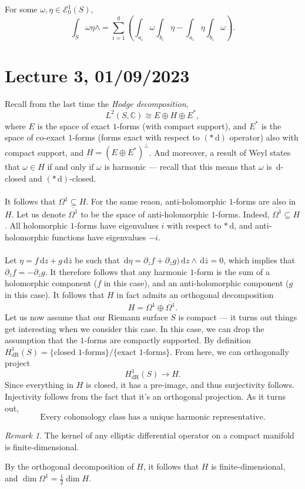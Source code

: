 \documentclass[a4paper]{report}
\theoremstyle{definition}
\theoremstyle{remark}
\newtheorem{remark}{Remark}
\theoremstyle{proposition}
\theoremstyle{conjecture}
\theoremstyle{lemma}
\theoremstyle{corollary}
\theoremstyle{exercise}
\theoremstyle{example}
\newcommand{\C}{\mathbb{C}}
\newcommand{\mcal}{\mathcal}
\newcommand{\diff}{\,\mathrm{d}}
\newcommand{\on}{\operatorname}
\begin{document}
\begin{theorem}
    For some $\omega, \eta \in \mcal{E}^1_0(S)$,
    $$\int_S \omega \eta \wedge = \sum_{i=1}^g \left( \int_{a_i}\omega \int_{b_i}\eta - \int_{a_i}\eta \int_{b_i}\omega\right).$$
\end{theorem}

\section{Lecture 3, 01/09/2023}

Recall from the last time the \emph{Hodge decomposition},
$$L^2(S,\C) \cong E \oplus H \oplus E^\ast,$$
where $E$ is the space of exact $1$-forms (with compact support), and $E^\ast$ is the space of co-exact 
$1$-forms (forms exact with respect to $(\ast \diff)$ operator) also with compact support, and 
$H = (E\oplus E^\ast)^\perp$.
And moreover, a result of Weyl states that $\omega \in H$ if and only if 
$\omega$ is harmonic --- recall that this means that $\omega$ is 
$\diff$-closed and $(\ast \diff)$-closed. \\\\It follows that $\Omega^1 \subseteq H$. 
For the same reaon, anti-holomorphic $1$-forms are also in $H$. Let us 
denote $\overline{\Omega^1}$ to be the space of anti-holomorphic $1$-forms.
Indeed, $\overline{\Omega^1}\subseteq H$. All holomorphic $1$-forms have eigenvalues $i$ with respect to $\ast \diff$, and anti-holomorphic functions have 
eigenvalues $-i$.\\\\
Let $\eta = f \diff z + g \diff \bar{z}$ be such that $\diff \eta = \partial_{\overline{z}}f + \partial_z g)\diff z \wedge \diff \bar{z}= 0$,
which implies that $\partial_{\bar{z}}f = -\partial_zg$. It therefore 
follows that any harmonic $1$-form is the sum of a holomorphic 
component ($f$ in this case), and an anti-holomorphic component ($g$ in this case). It follows that $H$ in fact admits an orthogonal decomposition 
$$H = \Omega^1\oplus \overline{\Omega^1}.$$
Let us now assume that our Riemann surface $S$ is compact --- it turns out 
things get interesting when we consider this case. In this case,
we can drop the assumption that the $1$-forms are compactly supported.
By definition $H^1_{\on{dR}}(S) = \lbrace \text{closed $1$-forms}\rbrace/\lbrace \text{exact $1$-forms}\rbrace$. From here, we can orthogonally 
project $$H^1_{\on{dR}}(S) \longrightarrow H.$$ 
Since everything in $H$ is closed, it has a pre-image, and thus surjectivity 
follows. Injectivity follows from the fact that it's an orthogonal projection.
As it turns out, $$\text{Every cohomology class has a unique harmonic representative.}$$
\begin{remark}
    The kernel of any elliptic differential operator on a compact manifold 
    is finite-dimensional.
\end{remark}
By the orthogonal decomposition of $H$, it follows that $H$ is finite-dimensional,
and $\dim\Omega^1 = \frac{1}{2}\dim H$.
\end{document}
